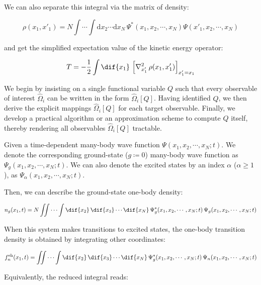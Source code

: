 We can also separate this integral via the matrix of density:

\begin{equation}
    \rho(x_1,x'_1)
    = N\int\cdots\int\mathrm{d}x_2\cdots\mathrm{d}x_N\,\Psi^*(x_1,x_2,\cdots,x_N)\Psi(x'_1,x_2,\cdots,x_N) 
\label{density_matrix}
\end{equation}

and get the simplified expectation value of the kinetic energy operator:

\begin{equation}
    T = -\frac{1}{2}\int\dif{x_1}\,\left[\nabla_{x'_1}^{2}\,\rho(x_1,x'_1)\right]_{x'_1=x_1}
\label{kinetic_energy_density_matrix}
\end{equation}

We begin by insisting on a single functional variable $Q$ such that every observable of interest $\hat\Omega_i$ can be written in the form $\hat\Omega_i[Q]$.
Having identified $Q$, we then derive the explicit mappings $\hat\Omega_i[Q]$ for each target observable.
Finally, we develop a practical algorithm or an approximation scheme to compute $Q$ itself, thereby rendering all observables $\hat\Omega_i[Q]$ tractable.

Given a time-dependent many-body wave function $\Psi(x_1,x_2,\cdots,x_N; t)$. 
We denote the corresponding ground-state ($g\coloneqq 0$) many-body wave function as 
$\Psi_g(x_1,x_2,\cdots,x_N; t)$.
We can also denote the excited states by an index $\alpha$ ($\alpha\geq1$), 
as $\Psi_{\alpha}(x_1,x_2,\cdots,x_N; t)$.

Then, we can describe the ground-state one-body density:

\begin{equation}
    n_g(x_1,t)=N\iint\cdots\int\dif{x_2}\,\dif{x_3}\cdots\dif{x_N}\,\Psi_g^*(x_1,x_2,\cdots,x_N;t)\,\Psi_g(x_1,x_2,\cdots,x_N;t) %
\label{ground_one-body_density}
\end{equation}

When this system makes transitions to excited states, the one-body transition density is obtained by integrating other coordinates:

\begin{equation}
    f_n^\mathrm{eh}(x_1,t)=\iint\cdots\int\dif{x_2}\,\dif{x_3}\cdots\dif{x_N}\,\Psi_g^*(x_1,x_2,\cdots,x_N;t)\,\Psi_n(x_1,x_2,\cdots,x_N;t)
\label{transition_one-body}
\end{equation}

Equivalently, the reduced integral reads: 

